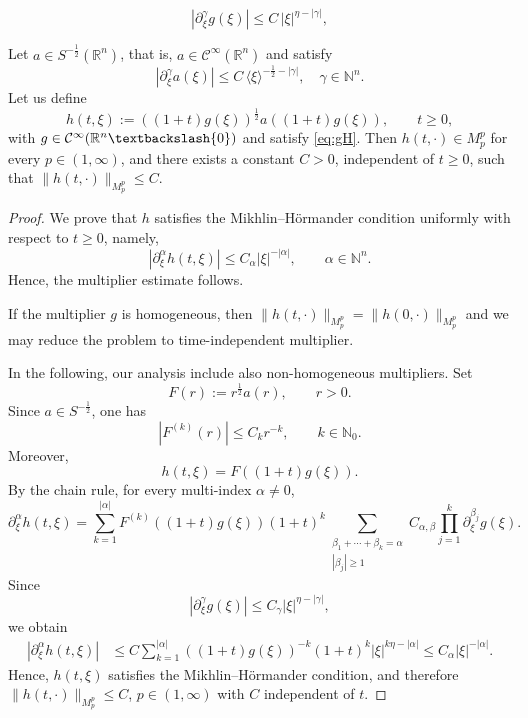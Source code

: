 \documentclass[10pt,a4paper]{amsart}
\begin{document}
\begin{equation}\label{eq:gH}
|\partial_\xi^\gamma g(\xi)|\leq C\,|\xi|^{\eta-|\gamma|},
\end{equation}

\begin{lemma}\label{lemma:m1-for-Plate-BQ}
Let $a\in S^{-\frac12}(\mathbb{R}^n)$, that is, $a\in \mathcal{C}^\infty(\mathbb{R}^n)$ and satisfy
\[ |\partial_\xi^\gamma a(\xi)|\leq C\,\langle \xi\rangle^{-\frac12-|\gamma|}, \quad \gamma\in \mathbb{N}^n. \]
Let us define
\[ h(t, \xi):=((1+t)g(\xi))^{\frac12}a((1+t)g(\xi)), \qquad t\ge0,  \]
with $g\in\mathcal{C}^\infty(\mathbb{R}^n\textbackslash\{0\})$ and satisfy \eqref{eq:gH}. Then $h(t, \cdot)\in M_p^p$ for every $p\in(1,\infty)$, and there exists a constant $C>0$, independent of $t\ge0$, such that $\|h(t, \cdot)\|_{M_p^p}\leq C$.
\end{lemma}

\begin{proof}
We prove that $h$ satisfies the Mikhlin--H\"ormander condition uniformly with respect to $t\ge0$, namely,
\[ |\partial_\xi^\alpha h(t, \xi)|\le C_\alpha |\xi|^{-|\alpha|}, \qquad \alpha\in\mathbb N^n. \]
Hence, the multiplier estimate follows.

If the   multiplier $g$ is homogeneous, then
$\|h(t, \cdot)\|_{M_p^p}=\|h(0, \cdot)\|_{M_p^p}$ and we may reduce the problem to time-independent multiplier.

In the following, our analysis include also  non-homogeneous multipliers. Set
\[ F(r):=r^{\frac12}a(r), \qquad r>0. \]
Since $a\in S^{-\frac12}$, one has
\[ |F^{(k)}(r)|\le C_k r^{-k}, \qquad k\in\mathbb N_0. \]
Moreover,
\[ h(t, \xi)=F((1+t)g(\xi)). \]
By the chain rule, for every multi-index $\alpha\neq0$,
\[ \partial_\xi^\alpha h(t, \xi) = \sum_{k=1}^{|\alpha|} F^{(k)}((1+t)g(\xi)) (1+t)^k
\sum_{\substack{\beta_1+\cdots+\beta_k=\alpha\\ |\beta_j|\ge1}}
C_{\alpha,\beta} \prod_{j=1}^k \partial_\xi^{\beta_j}g(\xi). \]
Since
\[ |\partial_\xi^\gamma g(\xi)|\le C_\gamma |\xi|^{\eta-|\gamma|}, \]
we obtain
\begin{align*}
|\partial_\xi^\alpha h(t, \xi)|
&\leq C \sum_{k=1}^{|\alpha|} ((1+t)g(\xi))^{-k}(1+t)^k |\xi|^{k\eta-|\alpha|} \leq C_\alpha |\xi|^{-|\alpha|}.
\end{align*}
Hence, $ h(t, \xi)$ satisfies the Mikhlin--H\"ormander condition, and therefore $\| h(t, \cdot)\|_{M_p^p}\leq C$, $p\in(1,\infty)$ with $C$ independent of $t$. %
\end{proof}
\end{document}
